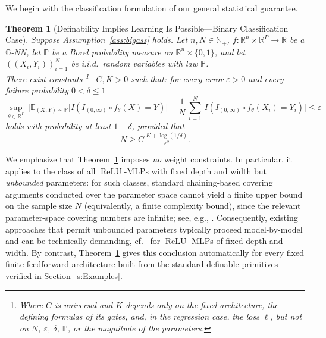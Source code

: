 \documentclass{article}
\theoremstyle{plain}
\newtheorem{theorem}{Theorem}[section]
\theoremstyle{definition}
\theoremstyle{remark}
\theoremstyle{plain}
\numberwithin{thm}{section}
\theoremstyle{definition}
\numberwithin{equation}{section}
\begin{document}
We begin with the classification formulation of our general statistical guarantee.
\begin{theorem}[Definability Implies Learning Is Possible---Binary Classification Case]
\label{thrm:class}
Suppose Assumption~\ref{ass:bigass} holds.
Let $n,N\in \mathbb{N}_+$, $f:\mathbb{R}^n\times \mathbb{R}^P\to \mathbb{R}$ be a $\mathbb{G}$-NN, let $\mathbb{P}$ be a Borel probability measure on $\mathbb{R}^n\times \{0,1\}$, and let $((X_i,Y_i))_{i=1}^N$ be i.i.d.\ random variables with law $\mathbb{P}$.
\hfill\\
\noindent
There exist constants%
\footnote{\label{note1}Where $C$ is universal and $K$ depends only on the fixed architecture, the defining formulas of its gates, and, in the regression case, the loss $\ell$, but not on $N$, $\varepsilon$, $\delta$, $\mathbb{P}$, or the magnitude of the parameters.}~%
$C,K>0$ such that: for every error $\varepsilon>0$ and every failure probability $0<\delta \le 1$ 
\[
    \sup_{\theta\in \mathbb{R}^P}\,
    \biggl|
        \mathbb{E}_{(X,Y)\sim \mathbb{P}}\big[
            I(I_{(0,\infty)}\circ f_{\theta}(X)=Y)
        \big]
        -
        \frac1{N}\,\sum_{i=1}^N\,
            I(I_{(0,\infty)}\circ f_{\theta}(X_i)=Y_i)
    \biggr|
    \le
    \varepsilon
\]
holds with probability at least $1-\delta$, provided that 
\[
N
\ge
   C\,\tfrac{K+\log(1/\delta)}{\varepsilon^2}
.
\]
\end{theorem}
We emphasize that Theorem~\ref{thrm:class} imposes \emph{no} weight constraints. In particular, it applies to the class of all $\operatorname{ReLU}$-MLPs with fixed depth and width but \emph{unbounded} parameters: for such classes, standard chaining-based covering arguments conducted over the parameter space cannot yield a finite upper bound on the sample size $N$ (equivalently, a finite complexity bound), since the relevant parameter-space covering numbers are infinite; see, e.g., \citep[Theorem 14.15]{petersen2024mathematical}. Consequently, existing approaches that permit unbounded parameters typically proceed model-by-model and can be technically demanding, cf.~\cite{bartlett2019nearly} for $\operatorname{ReLU}$-MLPs of fixed depth and width. 
By contrast, Theorem~\ref{thrm:class} gives this conclusion automatically for every fixed finite feedforward architecture built from the standard definable primitives verified in Section~\ref{s:Examples}.
\end{document}

